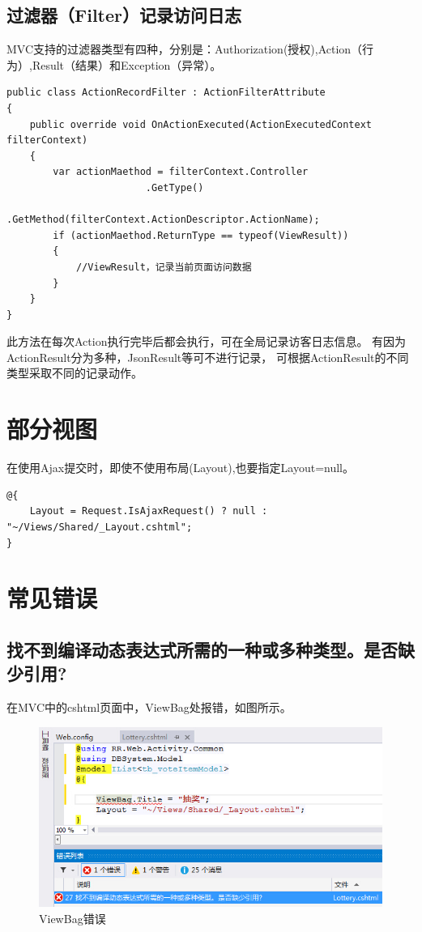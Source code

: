 \documentclass{book}
\begin{document}
\subsection{过滤器（Filter）记录访问日志}

MVC支持的过滤器类型有四种，分别是：Authorization(授权),Action（行为）,Result（结果）和Exception（异常）。

\begin{lstlisting}[language={[Sharp]C}]
public class ActionRecordFilter : ActionFilterAttribute
{
    public override void OnActionExecuted(ActionExecutedContext filterContext)
    {
        var actionMaethod = filterContext.Controller
                        .GetType()
                        .GetMethod(filterContext.ActionDescriptor.ActionName);
        if (actionMaethod.ReturnType == typeof(ViewResult))
        {
            //ViewResult，记录当前页面访问数据            
        }
    }
}
\end{lstlisting}

此方法在每次Action执行完毕后都会执行，可在全局记录访客日志信息。
有因为ActionResult分为多种，JsonResult等可不进行记录，
可根据ActionResult的不同类型采取不同的记录动作。

\section{部分视图}

在使用Ajax提交时，即使不使用布局(Layout),也要指定Layout=null。

\begin{lstlisting}[language={[Sharp]C}]
@{
    Layout = Request.IsAjaxRequest() ? null : "~/Views/Shared/_Layout.cshtml";
}
\end{lstlisting}

\section{常见错误}

\subsection{找不到编译动态表达式所需的一种或多种类型。是否缺少引用?}

在MVC中的cshtml页面中，ViewBag处报错，如图所示。

\begin{figure}[htbp]
	\centering
	\includegraphics[scale=0.8]{MVCViewBagError.jpg}
	\caption{ViewBag错误}
	\label{fig:MVCViewBagError}
\end{figure}
	
\end{document}
